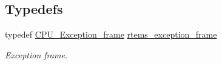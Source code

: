 \subsection*{Typedefs}
\begin{DoxyCompactItemize}
\item 
\mbox{\label{group__ClassicFatal_ga772c479d2892f46927c1cb6520d9aa73}} 
typedef \mbox{\hyperlink{structCPU__Exception__frame}{C\+P\+U\+\_\+\+Exception\+\_\+frame}} \mbox{\hyperlink{group__ClassicFatal_ga772c479d2892f46927c1cb6520d9aa73}{rtems\+\_\+exception\+\_\+frame}}
\begin{DoxyCompactList}\small\item\em Exception frame. \end{DoxyCompactList}\end{DoxyCompactItemize}
